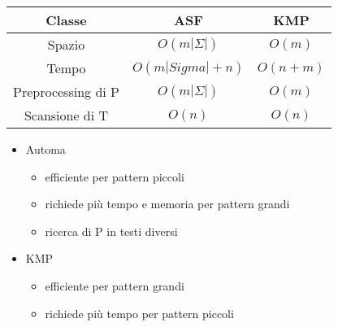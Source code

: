 \begin{center}
    \begin{tabular}{|c c c|}
        \hline
        Classe & ASF & KMP \\
        \hline
        Spazio & $O(m|\Sigma|)$ & $O(m)$ \\
        \hline
        Tempo & $O(m|Sigma| + n)$ & $O(n+m)$ \\
        \hline
        Preprocessing di P & $O(m|\Sigma|)$ & $O(m)$ \\
        \hline
        Scansione di T & $O(n)$ & $O(n)$ \\
        \hline
    \end{tabular}
\end{center}

\begin{itemize}
    \item Automa
    \begin{itemize}
        \item efficiente per pattern piccoli
        \item richiede più tempo e memoria per pattern grandi
        \item ricerca di P in testi diversi
    \end{itemize}
    \item KMP
    \begin{itemize}
        \item efficiente per pattern grandi
        \item richiede più tempo per pattern piccoli
    \end{itemize}
\end{itemize}
